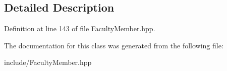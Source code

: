 \subsection{Detailed Description}


Definition at line 143 of file Faculty\+Member.\+hpp.



The documentation for this class was generated from the following file\+:\begin{DoxyCompactItemize}
\item 
include/Faculty\+Member.\+hpp\end{DoxyCompactItemize}

